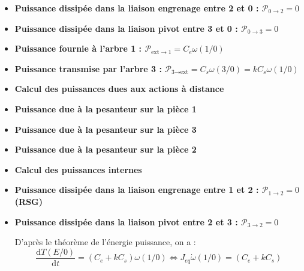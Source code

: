 \begin{multicols}{2}
\begin{corrige}
\begin{itemize}
\item \textbf{Puissance dissipée dans la liaison engrenage entre 2 et 0 : $\mathcal{P}_{0\rightarrow 2}=0$ } 
\item \textbf{Puissance dissipée dans la liaison pivot entre 3 et 0 : $\mathcal{P}_{0\rightarrow 3}=0$ } 
\item \textbf{Puissance fournie à l'arbre 1 : $\mathcal{P}_{\text{ext} \rightarrow 1} = C_e \omega(1/0)$} 
\item \textbf{Puissance transmise par l'arbre 3 : $\mathcal{P}_{\text{3} \rightarrow \text{ext}} = C_s \omega(3/0) = k C_s \omega(1/0) $} 
\item \textbf{Calcul des puissances dues aux actions à distance}

\item \textbf{Puissance due à la pesanteur sur la pièce 1}

\item \textbf{Puissance due à la pesanteur sur la pièce 3}

\item \textbf{Puissance due à la pesanteur sur la pièce 2}

\item \textbf{Calcul des puissances internes}

\item \textbf{Puissance dissipée dans la liaison engrenage entre 1 et 2 : $\mathcal{P}_{1\rightarrow 2} = 0$ (RSG)} 


\item \textbf{Puissance dissipée dans la liaison pivot entre 2 et 3 : $\mathcal{P}_{3\rightarrow 2} = 0$}

D'après le théorème de l'énergie puissance, on a : 
$$
\dfrac{\text{d}T\left(E/0\right)}{\text{d}t} = \left( C_e + kC_s\right)\omega(1/0)
\Leftrightarrow
J_{eq}\dot{\omega}(1/0) = \left( C_e + kC_s\right)
$$
\end{itemize} 
\end{corrige}

\else
\fi
\ifprof
\else
\end{multicols}
\fi
